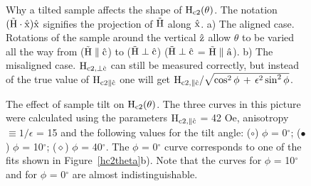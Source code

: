 \begin{figure}
\vspace{6in}
\caption[Why a
tilted  sample  affects the shape  of  $\rm H_{c2}(\theta)$.]{Why a  tilted
sample  affects the shape  of $\rm H_{c2}(\theta)$.  The notation $(\rm
\vec{H} \cdot \hat{x})\hat{x}$ signifies the projection of $\rm \vec{H}$
along $\rm \hat{x}$. a)  The aligned case.   Rotations of the sample around
the vertical $\rm  \hat{z}$ allow  $\theta$ to be  varied all  the way from
($\rm \vec{H}\parallel\hat{c}$) to ($\rm
\vec{H}\perp\hat{c}$)  ($\rm
\vec{H}\perp\hat{c}$  = $\rm  \vec{H}\parallel  \hat{a}$).   b) The
misaligned  case.   $\rm    H_{c2,\perp\hat{c}}$ can  still    be  measured
correctly,  but instead of  the true value  of $\rm H_{c2\parallel\hat{c}}$
one will get $\rm H_{c2,\parallel\hat{c}}/\sqrt{\cos^2\phi \, + \,
\epsilon^2\sin^2\phi}$.}
\label{misalign}
\end{figure}

\begin{figure}
\vspace{4.5in}
\caption[Effect of sample tilt on $\rm H_{c2}(\theta)$.]{The effect of
sample tilt on $\rm H_{c2}(\theta)$.  The three curves in this picture were
calculated using the parameters  $\rm H_{c2,\parallel \hat{c}}$ = 42 Oe,
anisotropy $\equiv 1/\epsilon$ = 15 and the following  values for the tilt
angle:  ($\circ$) $\phi$   =  0$^{\circ}$;  ($\bullet$)   $\phi$    =
10$^{\circ}$; ($\diamond$) $\phi$  = 40$^{\circ}$.  The $\phi$  = 0$^{\circ}$
curve  corresponds  to one  of  the  fits shown in Figure~\ref{hc2theta}b).
Note that the curves for $\phi$ = 10$^{\circ}$ and for $\phi$ = 0$^{\circ}$
are almost indistinguishable.}
\label{tilteffect}
\end{figure}

